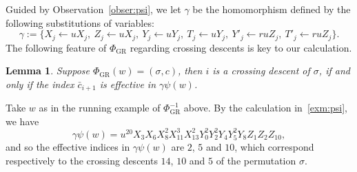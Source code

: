 \documentclass[12pt]{amsart} %
\numberwithin{equation}{section}
\theoremstyle{plain}
\newtheorem{lemma}[theorem]{Lemma}
\theoremstyle{definition}
\begin{document}
Guided by Observation~\ref{obser:psi}, we let $\gamma$ be the homomorphism defined by the following substitutions of variables:
	\begin{equation}\label{subs}
	\gamma:=\{X_j\leftarrow u X_j, \
	Z_j\leftarrow u X_j, \
	Y_j\leftarrow u Y_j, \
	T_j\leftarrow u Y_j, \
	Y'_j\leftarrow ru Z_j, \
	T'_j\leftarrow ru Z_j\}.
	\end{equation}
The following feature of $\Phi_{\mathrm{GR}}$ regarding crossing descents is key to our calculation. 
\begin{lemma}\label{lem:xdes-eff}
Suppose $\Phi_{\mathrm{GR}}(w)=(\sigma,c)$, then $i$ is a crossing descent of $\sigma$, if and only if the index $\bar c_{i+1}$ is effective in $\gamma\psi(w)$.
\end{lemma}

Take $w$ as in the running example of $\Phi_{\mathrm{GR}}^{-1}$  above. By the calculation in~\eqref{exm:psi}, we have 
$$
\gamma\psi(w)=u^{20}X_3X_6X_8^2X_{11}^3X_{13}^2Y_0^2Y_2^2Y_4Y_5^2Y_8Z_1Z_2Z_{10},
$$
and so the effective indices in $\gamma\psi(w)$ are $2$, $5$ and $10$, which correspond respectively to the crossing descents $14$, $10$ and $5$ of the permutation $\sigma$.
\end{document}
